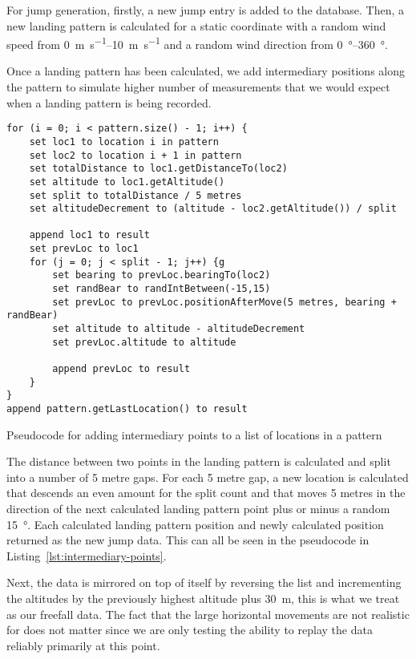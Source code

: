 For jump generation, firstly, a new jump entry is added to the database. Then, a new landing pattern is calculated for a static coordinate with a random wind speed from \SIrange{0}{10}{\metre\per\second} and a random wind direction from \SIrange{0}{360}{\degree}.

Once a landing pattern has been calculated, we add intermediary positions along the pattern to simulate higher number of measurements that we would expect when a landing pattern is being recorded.

\begin{listing*}
  \centering
  \begin{verbatim}
for (i = 0; i < pattern.size() - 1; i++) {
    set loc1 to location i in pattern
    set loc2 to location i + 1 in pattern
    set totalDistance to loc1.getDistanceTo(loc2)
    set altitude to loc1.getAltitude()
    set split to totalDistance / 5 metres
    set altitudeDecrement to (altitude - loc2.getAltitude()) / split

    append loc1 to result
    set prevLoc to loc1
    for (j = 0; j < split - 1; j++) {g
        set bearing to prevLoc.bearingTo(loc2)
        set randBear to randIntBetween(-15,15)
        set prevLoc to prevLoc.positionAfterMove(5 metres, bearing + randBear)
        set altitude to altitude - altitudeDecrement
        set prevLoc.altitude to altitude

        append prevLoc to result
    }
}
append pattern.getLastLocation() to result
  \end{verbatim}
  \caption{Pseudocode for adding intermediary points to a list of locations in a pattern}\label{lst:intermediary-points}
\end{listing*}

The distance between two points in the landing pattern is calculated and split into a number of 5 metre gaps. For each 5 metre gap, a new location is calculated that descends an even amount for the split count and that moves 5 metres in the direction of the next calculated landing pattern point plus or minus a random \SI{15}{\degree}. Each calculated landing pattern position and newly calculated position returned as the new jump data. This can all be seen in the pseudocode in Listing~\vref{lst:intermediary-points}.

Next, the data is mirrored on top of itself by reversing the list and incrementing the altitudes by the previously highest altitude plus \SI{30}{\metre}, this is what we treat as our freefall data. The fact that the large horizontal movements are not realistic for does not matter since we are only testing the ability to replay the data reliably primarily at this point.

